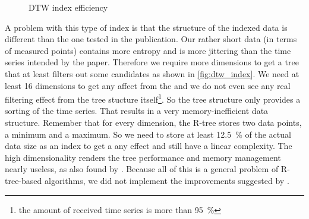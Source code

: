 \begin{figure}
    \centering
    
    \caption{DTW index efficiency}
    \label{fig:dtw_index}
\end{figure}

A problem with this type of index is that the structure of the indexed data is different than the one tested in the publication. Our rather short data (in terms of measured points) contains more entropy and is more jittering than the time series intended by the paper. Therefore we require more dimensions to get a tree that at least filters out some candidates as shown in \autoref{fig:dtw_index}. We need at least \num{16} dimensions to get any affect from the  and we do not even see any real filtering effect from the tree stucture itself\footnote{the amount of received time series is more than \SI{95}{\percent}}. So the tree structure only provides a sorting of the time series. That results in a very memory-inefficient data structure. Remember that for every dimension, the R-tree stores two data points, a minimum and a maximum. So we need to store at least \SI{12.5}{\percent} of the actual data size as an index to get a any effect and still have a linear complexity. The high dimensionality renders the tree performance and memory management nearly useless, as also found by \cite{rtree_highdim}. Because all of this is a general problem of R-tree-based algorithms, we did not implement the improvements suggested by \cite{LB_Improved}.
